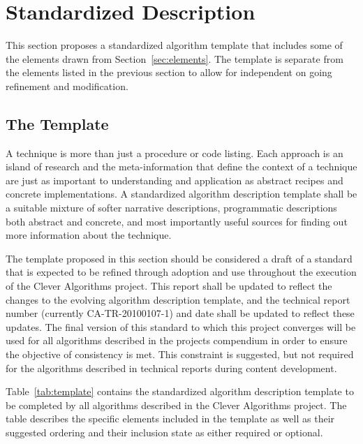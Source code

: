 \documentclass[a4paper, 11pt]{article}
\newcommand{\myreportdate}{20100107}
\newcommand{\myreportversion}{1}
\begin{document}
\section{Standardized Description} 
\label{sec:template}
This section proposes a standardized algorithm template that includes some of the elements drawn from Section~\ref{sec:elements}. The template is separate from the elements listed in the previous section to allow for independent on going refinement and modification.

\subsection{The Template}
A technique is more than just a procedure or code listing. Each approach is an island of research and the meta-information that define the context of a technique are just as important to understanding and application as abstract recipes and concrete implementations. A standardized algorithm description template shall be a suitable mixture of softer narrative descriptions, programmatic descriptions both abstract and concrete, and most importantly useful sources for finding out more information about the technique.  

The template proposed in this section should be considered a draft of a standard that is expected to be refined through adoption and use throughout the execution of the Clever Algorithms project. This report shall be updated to reflect the changes to the evolving algorithm description template, and the technical report number (currently CA-TR-{\myreportdate}-\myreportversion) and date shall be updated to reflect these updates. The final version of this standard to which this project converges will be used for all algorithms described in the projects compendium in order to ensure the objective of consistency is met. This constraint is suggested, but not required for the algorithms described in technical reports during content development.

Table~\ref{tab:template} contains the standardized algorithm description template to be completed by all algorithms described in the Clever Algorithms project. The table describes the specific elements included in the template as well as their suggested ordering and their inclusion state as either required or optional. 
\end{document}
